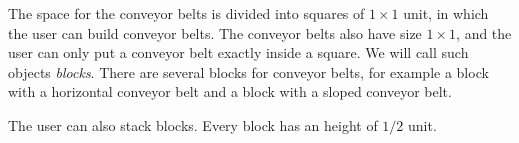 The space for the conveyor belts is divided into squares of $1 \times 1$ unit, in which the user can build conveyor belts. The conveyor belts also have size $1 \times 1$, and the user can only put a conveyor belt exactly inside a square. We will call such objects \textit{blocks}. There are several blocks for conveyor belts, for example a block with a horizontal conveyor belt and a block with a sloped conveyor belt.

The user can also stack blocks. Every block has an height of $1/2$ unit.